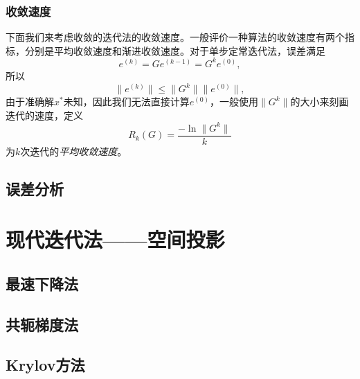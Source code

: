 \documentclass[a4paper,10pt]{ctexart}
\begin{document}
\subsubsection{收敛速度}
下面我们来考虑收敛的迭代法的收敛速度。一般评价一种算法的收敛速度有两个指标，分别是平均收敛速度和渐进收敛速度。对于单步定常迭代法，误差满足
\[
    e^{(k)} = G e^{(k-1)} = G^k e^{(0)},
\]
所以
\[
    \| e^{(k)} \| \leqslant \| G^k \| \| e^{(0)} \|,
\]
由于准确解$ x^* $未知，因此我们无法直接计算$ e^{(0)} $，一般使用$ \| G^k \| $的大小来刻画迭代的速度，定义
\begin{equation}
    R_k(G) = \frac{-\ln \| G^k \|}{k}
\end{equation}
为$ k $次迭代的\emph{平均收敛速度}。

\subsection{误差分析}

\section{现代迭代法——空间投影}

\subsection{最速下降法}

\subsection{共轭梯度法}

\subsection{Krylov方法}


\end{document}
